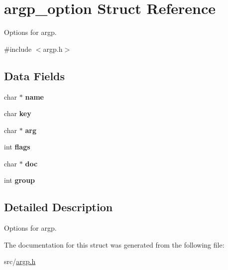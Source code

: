 \hypertarget{structargp__option}{}\section{argp\+\_\+option Struct Reference}
\label{structargp__option}


Options for argp.  




{\ttfamily \#include $<$argp.\+h$>$}

\subsection*{Data Fields}
\begin{DoxyCompactItemize}
\item 
\hypertarget{structargp__option_a78c5e79db0301faca1a5b330ae5f2fe8}{}\label{structargp__option_a78c5e79db0301faca1a5b330ae5f2fe8} 
char $\ast$ {\bfseries name}
\item 
\hypertarget{structargp__option_a38148c94016633992dcb4c56b2f507f7}{}\label{structargp__option_a38148c94016633992dcb4c56b2f507f7} 
char {\bfseries key}
\item 
\hypertarget{structargp__option_a160a28b0b77ffcd7439147be5a1f9437}{}\label{structargp__option_a160a28b0b77ffcd7439147be5a1f9437} 
char $\ast$ {\bfseries arg}
\item 
\hypertarget{structargp__option_af17429de60a53803ab6b9c01b33e6136}{}\label{structargp__option_af17429de60a53803ab6b9c01b33e6136} 
int {\bfseries flags}
\item 
\hypertarget{structargp__option_a0acd2ef5c42f8adc66fcca72fb5b6625}{}\label{structargp__option_a0acd2ef5c42f8adc66fcca72fb5b6625} 
char $\ast$ {\bfseries doc}
\item 
\hypertarget{structargp__option_a67c7f0d5100555176a1b38dfd398e530}{}\label{structargp__option_a67c7f0d5100555176a1b38dfd398e530} 
int {\bfseries group}
\end{DoxyCompactItemize}


\subsection{Detailed Description}
Options for argp. 

The documentation for this struct was generated from the following file\+:\begin{DoxyCompactItemize}
\item 
src/\hyperlink{argp_8h}{argp.\+h}\end{DoxyCompactItemize}
